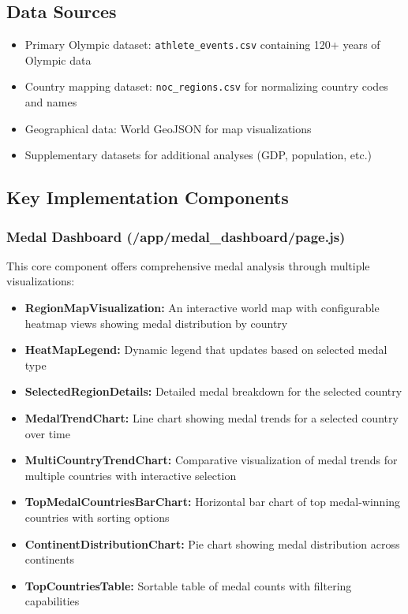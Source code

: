 \documentclass[a4paper, 12pt]{article}
\begin{document}
\subsection{Data Sources}
\begin{itemize}[leftmargin=*]
    \item Primary Olympic dataset: \texttt{athlete\_events.csv} containing 120+ years of Olympic data
    \item Country mapping dataset: \texttt{noc\_regions.csv} for normalizing country codes and names
    \item Geographical data: World GeoJSON for map visualizations
    \item Supplementary datasets for additional analyses (GDP, population, etc.)
\end{itemize}

\subsection{Key Implementation Components}
\subsubsection{Medal Dashboard (/app/medal\_dashboard/page.js)}
This core component offers comprehensive medal analysis through multiple visualizations:

\begin{itemize}[leftmargin=*]
    \item \textbf{RegionMapVisualization:} An interactive world map with configurable heatmap views showing medal distribution by country
    \item \textbf{HeatMapLegend:} Dynamic legend that updates based on selected medal type
    \item \textbf{SelectedRegionDetails:} Detailed medal breakdown for the selected country
    \item \textbf{MedalTrendChart:} Line chart showing medal trends for a selected country over time
    \item \textbf{MultiCountryTrendChart:} Comparative visualization of medal trends for multiple countries with interactive selection
    \item \textbf{TopMedalCountriesBarChart:} Horizontal bar chart of top medal-winning countries with sorting options
    \item \textbf{ContinentDistributionChart:} Pie chart showing medal distribution across continents
    \item \textbf{TopCountriesTable:} Sortable table of medal counts with filtering capabilities
\end{itemize}
\end{document}

